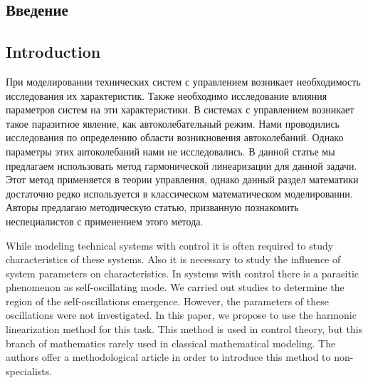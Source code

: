 \begin{Russian}
\section{Введение}
\end{Russian}
\begin{English}
\section{Introduction}
\end{English}
\label{sec:intro}

\begin{Russian}
При моделировании технических систем с управлением возникает
необходимость исследования их характеристик.
Также необходимо исследование влияния параметров систем на эти
характеристики.
В системах с управлением возникает такое паразитное явление, как
автоколебательный режим.
Нами проводились исследования по определению области
возникновения автоколебаний. Однако параметры этих автоколебаний нами
не исследовались. В данной статье мы предлагаем использовать метод
гармонической линеаризации для данной задачи. Этот метод применяется в
теории управления, однако данный раздел математики достаточно редко
используется в классическом математическом моделировании. Авторы
предлагаю методическую статью, призванную познакомить неспециалистов с
применением этого метода.
\end{Russian}
\begin{English}
While modeling technical systems with control it is often required to 
study characteristics of these systems. Also it is necessary to study the influence 
of system parameters on characteristics. In systems with control 
there is a parasitic phenomenon as self-oscillating mode.
We carried out 
studies to determine the region of the self-oscillations emergence. 
However, the parameters of these oscillations were not investigated. 
In this paper, we propose to use the harmonic 
linearization method for this task. This method is used in control 
theory, but this branch of mathematics rarely used in classical 
mathematical modeling. The authors offer a methodological article in order  
to introduce this method to non-specialists. 
\end{English}

\begin{Russian}
\end{Russian}
\begin{English}
\end{English}

